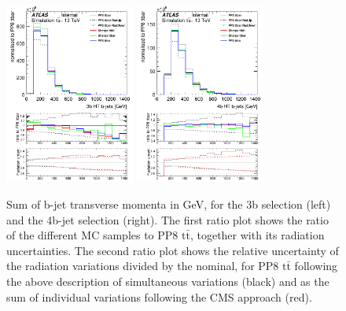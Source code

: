 \begin{figure}[!htb]
\centering
\includegraphics[width=0.38\textwidth]{Plots/ttbb/hisgenHTbjets_4j3t__div}
\includegraphics[width=0.38\textwidth]{Plots/ttbb/hisgenHTbjets_4j4t__div}
  \caption{Sum of b-jet transverse momenta in GeV, for the 3b selection (left) and the 4b-jet selection (right). The first ratio plot shows the ratio of the different MC samples to PP8 $\mathrm{t\bar{t}}$, together with its radiation uncertainties. The second ratio plot shows the relative uncertainty of the radiation variations divided by the nominal, for PP8 $\mathrm{t\bar{t}}$ following the above description of simultaneous variations (black) and as the sum of individual variations following the CMS approach (red). \label{ttbb:HTbjets}}
\end{figure}


